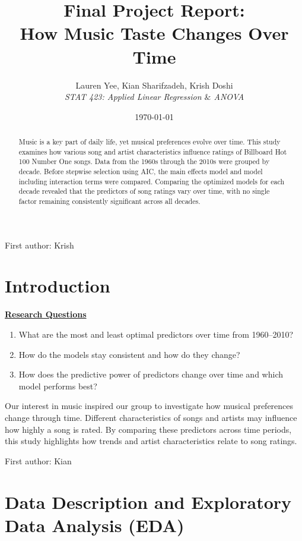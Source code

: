 \documentclass[11pt]{article}
\title{\textbf{Final Project Report:\\How Music Taste Changes Over Time}}
\author{
    Lauren Yee, 
    Kian Sharifzadeh, 
    Krish Doshi \\
    \vspace{0.3cm}
    \textit{STAT 423: Applied Linear Regression $\&$ ANOVA}
}
\date{\today}
\begin{document}
\maketitle

\begin{abstract}
Music is a key part of daily life, yet musical preferences evolve over time. 
This study examines how various song and artist characteristics influence ratings of Billboard Hot 100 Number One songs. 
Data from the 1960s through the 2010s were grouped by decade. Before stepwise selection using AIC, the main effects model and model including interaction terms were compared.
Comparing the optimized models for each decade revealed that the predictors of song ratings vary over time, with no single factor remaining consistently significant across all decades.
\end{abstract}

\onehalfspacing
 
{\scriptsize First author: Krish}
\section{Introduction}

\textbf{\underline{Research Questions}}

\begin{enumerate}
\item What are the most and least optimal predictors over time from 1960--2010?
\item How do the models stay consistent and how do they change?
\item How does the predictive power of predictors change over time and which model performs best?
\end{enumerate}

Our interest in music inspired our group to investigate how musical preferences change through time. 
Different characteristics of songs and artists may influence how highly a song is rated.
By comparing these predictors across time periods, this study highlights how trends and artist characteristics relate to song ratings.

{\scriptsize First author: Kian}
\section{Data Description and Exploratory Data Analysis (EDA)}
\end{document}
